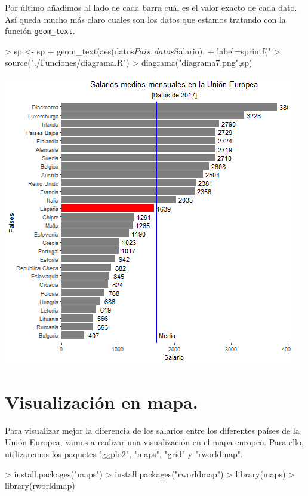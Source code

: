 \documentclass [a4paper] {article}
\begin{document}
\bigskip
Por último añadimos al lado de cada barra cuál es el valor exacto de cada dato. Así queda mucho más claro cuales
son los datos que estamos tratando con la función \texttt{geom\_text}.
\begin{Schunk}
\begin{Sinput}
> sp <- sp + geom_text(aes(datos$Pais,datos$Salario),
+         label=sprintf("           %
> source("./Funciones/diagrama.R")
> diagrama("diagrama7.png",sp)
\end{Sinput}
\end{Schunk}

\includegraphics[width=\textwidth]{diagrama7}

\section{Visualización en mapa.}
\bigskip
Para visualizar mejor la diferencia de los salarios entre los diferentes países de la Unión Europea, vamos a 
realizar una visualización en el mapa europeo. Para ello, utilizaremos los paquetes "ggplo2", "maps", "grid" y "rworldmap".
\begin{Schunk}
\begin{Sinput}
> install.packages("maps")
> install.packages("rworldmap")
> library(maps)
> library(rworldmap)
\end{Sinput}
\end{Schunk}
\end{document}
